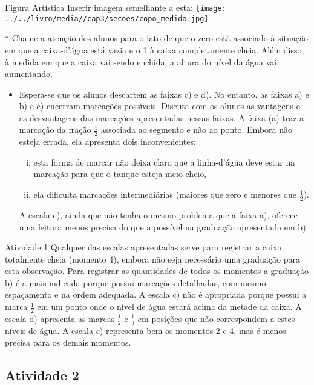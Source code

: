 \documentclass[oneside]{book}
\begin{document}
\begin{multicols}{2}
  \begin{imagem*}[breakable]{}{}     Figura Artística    
    Inserir imagem semelhante a esta:    
        \texttt{[image: ../../livro/media//cap3/secoes/copo\_medida.jpg]}    
  \end{imagem*}     
     * Chame a atenção dos alunos para o fato de que o zero está associado à situação em que a caixa-d'água está vazia e o 1 à caixa completamente cheia. Além disso, à medida em que a caixa vai sendo enchida, a altura do nível da água vai aumentando.  
\begin{itemize} %
    \item       Espera-se que os alunos descartem as faixas c) e d). No entanto, as faixas a) e b) e e) encerram marcações possíveis. Discuta com os alunos as vantagens e as desvantagens das marcações apresentadas nessas faixas. A faixa (a) traz a marcação da fração       $\frac{1}{2}$       associada ao segmento e não ao ponto. Embora não esteja errada, ela apresenta dois inconvenientes: 
    \begin{enumerate}[(i)]
     \item esta forma de marcar não deixa claro que a linha-d'água deve estar na marcação para que o tanque esteja meio cheio,
     \item ela dificulta marcações intermediárias (maiores que zero e menores que $\frac{1}{2}$).
    \end{enumerate}
  A escala e), ainda que não tenha o mesmo problema que a faixa a), oferece uma leitura menos precisa do que a possível na graduação apresentada em b).
\end{itemize} %

\begin{resposta*}{Atividade 1}
  Qualquer das escalas apresentadas serve para registrar a caixa totalmente cheia (momento 4), embora não seja necessário uma graduação para esta observação.  
  Para registrar as quantidades de todos os momentos a graduação b) é a mais indicada porque possui marcações detalhadas, com mesmo espaçamento e na ordem adequada.  
  A escala c) não é apropriada porque possui a marca   $\frac{1}{2}$   em um ponto onde o nível de água estará acima da metade da caixa.  
  A escala d) apresenta as marcas   $\frac{1}{2}$   e   $\frac{1}{3}$   em posições que não correspondem a estes níveis de água.  
  A escala e) representa bem os momentos 2 e 4, mas é menos precisa para os demais momentos.  
\end{resposta*}


\subsection{Atividade 2}


\end{multicols}
\end{document}
